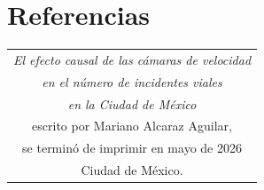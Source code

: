 \documentclass[11pt, oneside]{book}
\begin{document}
\tableofcontents


\listoftables

\listoffigures


\mainmatter %

\pagestyle{plain}
















\begin{appendix}



\end{appendix}



\chapter*{Referencias}



\newpage
\thispagestyle{empty}
\begin{table}[p]
\centering
\small
\label{ed}
\begin{tabular}{c}
\textit{El efecto causal de las cámaras de velocidad}\\ \textit{en el número de incidentes viales}\\ \textit{en la Ciudad de México}\\ escrito por Mariano Alcaraz Aguilar,\\ se terminó de imprimir en mayo de 2026\\ Ciudad de México.
\end{tabular}
\end{table}


\end{document}

